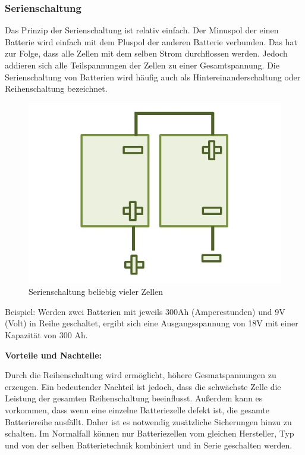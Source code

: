 \subsubsection{Serienschaltung}
Das Prinzip der Serienschaltung ist relativ einfach. Der Minuspol der einen Batterie wird einfach mit dem Pluspol der anderen Batterie verbunden. Das hat zur Folge, dass alle Zellen mit dem selben Strom durchflossen werden. Jedoch addieren sich alle Teilspannungen der Zellen zu einer Gesamtspannung. Die Serienschaltung von Batterien wird häufig auch als Hintereinanderschaltung oder Reihenschaltung bezeichnet.

\begin{figure}[H]
	\begin{center}
		\includegraphics[scale=1.0]{figures/Akku/SerienschaltungzweierBatterien.org.jpg}
		\caption{Serienschaltung beliebig vieler Zellen}
	\end{center}
\end{figure}

Beispiel: Werden zwei Batterien mit jeweils 300Ah (Amperestunden) und 9V (Volt) in Reihe geschaltet, ergibt sich eine Ausgangsspannung von 18V mit einer Kapazität von 300 Ah. \medskip

\textbf{Vorteile und Nachteile:}

Durch die Reihenschaltung wird ermöglicht, höhere Gesmatspannungen zu erzeugen. Ein bedeutender Nachteil ist jedoch, dass die schwächste Zelle die Leistung der gesamten Reihenschaltung beeinflusst. Außerdem kann es vorkommen, dass wenn eine einzelne Batteriezelle defekt ist, die gesamte Batteriereihe ausfällt. Daher ist es notwendig zusätzliche Sicherungen hinzu zu schalten. Im Normalfall können nur Batteriezellen vom gleichen Hersteller, Typ und von der selben Batterietechnik kombiniert und in Serie geschalten werden.
\newpage

